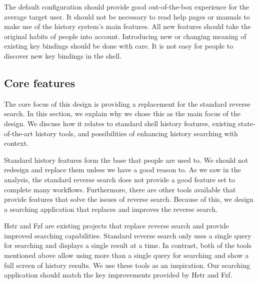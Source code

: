 The default configuration should provide good out-of-the-box experience for the average target user. It should not be necessary to read help pages or manuals to make use of the history system's main features. 
All new features should take the original habits of people into account. 
Introducing new or changing meaning of existing key bindings should be done with care. It is not easy for people to discover new key bindings in the shell.


\subsection{Core features}

The core focus of this design is providing a replacement for the standard reverse search. In this section, we explain why we chose this as the main focus of the design. We discuss how it relates to standard shell history features, existing state-of-the-art history tools, and possibilities of enhancing history searching with context.


Standard history features form the base that people are used to. We should not redesign and replace them unless we have a good reason to.
As we saw in the analysis, the standard reverse search does not provide a good feature set to complete many workflows. Furthermore, there are other tools available that provide features that solve the issues of reverse search. Because of this, we design a searching application that replaces and improves the reverse search.




Hstr\cite{toolshstr} and Fzf\cite{tools-fzf} are existing projects that replace reverse search and provide improved searching capabilities. 
Standard reverse search only uses a single query for searching and displays a single result at a time. In contrast, both of the tools mentioned above allow using more than a single query for searching and show a full screen of history results. We use these tools as an inspiration. Our searching application should match the key improvements provided by Hstr and Fzf. 


